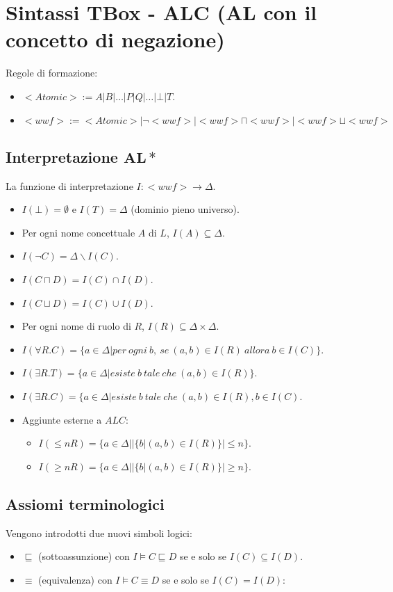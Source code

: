 \section{Sintassi TBox - ALC (AL con il concetto di negazione)}
Regole di formazione:
\begin{itemize}
\item $< Atomic>:=A|B|\dots|P|Q|\dots|\bot|T$.
\item $<wwf>:=<Atomic>|\neg<wwf>|<wwf>\sqcap<wwf>|<wwf>\sqcup<wwf>$ 
\end{itemize}
\subsection{Interpretazione $\mathbf{AL*}$}
La funzione di interpretazione $I:<wwf>\rightarrow \Delta$.
\begin{itemize}
\item $I(\bot)=\emptyset$ e $I(T)=\Delta$ (dominio pieno universo).
\item Per ogni nome concettuale $A$ di $L$, $I(A)\subseteq\Delta$.
\item $I(\neg C)=\Delta\backslash I(C)$.
\item $I(C\sqcap D)=I(C)\cap I(D)$.
\item $I(C\sqcup D)=I(C)\cup I(D)$.
\item Per ogni nome di ruolo di $R$, $I(R)\subseteq \Delta\times\Delta$.
\item $I(\forall R.C)=\{a\in\Delta| per\ ogni\ b,\ se\ (a,b)\in I(R)\ allora\ b\in I(C)\}$.
\item $I(\exists R.T)=\{a\in \Delta| esiste\ b\ tale\ che\ (a,b)\in I(R)\}$.
\item $I(\exists R.C)=\{a\in\Delta| esiste\ b\ tale\ che\ (a,b)\in I(R),b\in I(C)$.
\item Aggiunte esterne a $ALC$:
\begin{itemize}
\item $I(\le nR)=\{a\in\Delta| |\{b|(a,b)\in I(R)\}|\le n\}$.
\item $I(\ge nR)=\{a\in\Delta| |\{b|(a,b)\in I(R)\}|\ge n\}$.
\end{itemize}
\end{itemize}
\subsection{Assiomi terminologici}
Vengono introdotti due nuovi simboli logici:
\begin{itemize}
\item $\sqsubseteq$ (sottoassunzione) con $I\models C\sqsubseteq D$ se e solo se $I(C)\subseteq I(D)$.
\item $\equiv$ (equivalenza) con $I\models C\equiv D$ se e solo se $I(C)=I(D)$:
\end{itemize}
